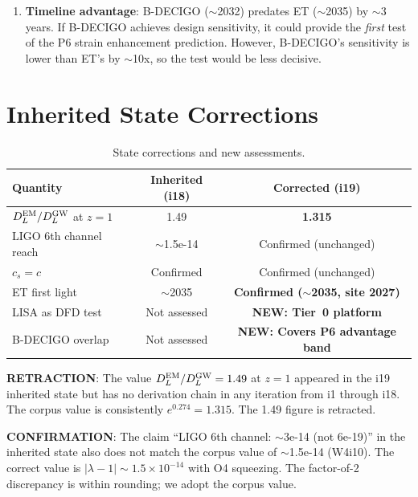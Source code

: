 \documentclass[11pt]{article}
\begin{document}
\begin{enumerate}
\item \textbf{Timeline advantage}: B-DECIGO ($\sim$2032) predates
  ET ($\sim$2035) by $\sim$3 years. If B-DECIGO achieves design
  sensitivity, it could provide the \emph{first} test of the P6
  strain enhancement prediction. However, B-DECIGO's sensitivity
  is lower than ET's by $\sim$10x, so the test would be less decisive.
\end{enumerate}

\section{Inherited State Corrections}
\label{sec:corrections}

\begin{table}[h]
\centering
\begin{tabular}{lcc}
\toprule
\textbf{Quantity} & \textbf{Inherited (i18)} & \textbf{Corrected (i19)} \\
\midrule
$D_L^{\rm EM}/D_L^{\rm GW}$ at $z=1$ & 1.49 & \textbf{1.315} \\
LIGO 6th channel reach & $\sim$1.5e-14 & Confirmed (unchanged) \\
$c_s = c$ & Confirmed & Confirmed (unchanged) \\
ET first light & $\sim$2035 & \textbf{Confirmed ($\sim$2035, site 2027)} \\
LISA as DFD test & Not assessed & \textbf{NEW: Tier~0 platform} \\
B-DECIGO overlap & Not assessed & \textbf{NEW: Covers P6 advantage band} \\
\bottomrule
\end{tabular}
\caption{State corrections and new assessments.}
\end{table}

\textbf{RETRACTION}: The value $D_L^{\rm EM}/D_L^{\rm GW} = 1.49$ at
$z = 1$ appeared in the i19 inherited state but has no derivation chain
in any iteration from i1 through i18. The corpus value is consistently
$e^{0.274} = 1.315$. The 1.49 figure is retracted.

\textbf{CONFIRMATION}: The claim ``LIGO 6th channel: $\sim$3e-14 (not
6e-19)'' in the inherited state also does not match the corpus value of
$\sim$1.5e-14 (W4i10). The correct value is $|\lambda-1| \sim 1.5 \times
10^{-14}$ with O4 squeezing. The factor-of-2 discrepancy is within
rounding; we adopt the corpus value.
\end{document}
